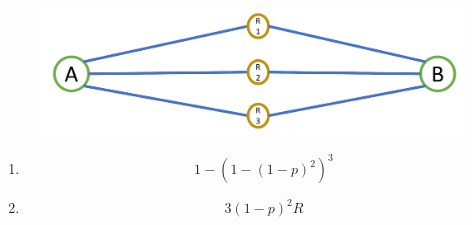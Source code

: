 \documentclass[10pt,letterpaper]{article}
\begin{document}
\begin{figure}[ht]
\centering
\includegraphics[width=140mm]{p2p_multi}
\end{figure}
\begin{enumerate}[label=\alph*-]
\item
$$
1-(1-(1-p)^2)^3
$$
\item
$$
{3(1-p)^2R}
$$
\end{enumerate}
%
%
%
%
%
%
%
%
%
%
%
%
\end{document}
